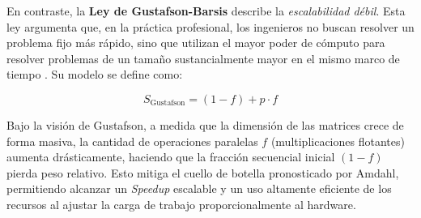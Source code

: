 En contraste, la \textbf{Ley de Gustafson-Barsis} describe la \textit{escalabilidad débil}. Esta ley argumenta que, en la práctica profesional, los ingenieros no buscan resolver un problema fijo más rápido, sino que utilizan el mayor poder de cómputo para resolver problemas de un tamaño sustancialmente mayor en el mismo marco de tiempo \parencite{Gustafson1988Reevaluating}. Su modelo se define como:

\begin{equation}
    S_{\text{Gustafson}} = (1 - f) + p \cdot f
\end{equation}

Bajo la visión de Gustafson, a medida que la dimensión de las matrices crece de forma masiva, la cantidad de operaciones paralelas \(f\) (multiplicaciones flotantes) aumenta drásticamente, haciendo que la fracción secuencial inicial \((1 - f)\) pierda peso relativo. Esto mitiga el cuello de botella pronosticado por Amdahl, permitiendo alcanzar un \textit{Speedup} escalable y un uso altamente eficiente de los recursos al ajustar la carga de trabajo proporcionalmente al hardware.
